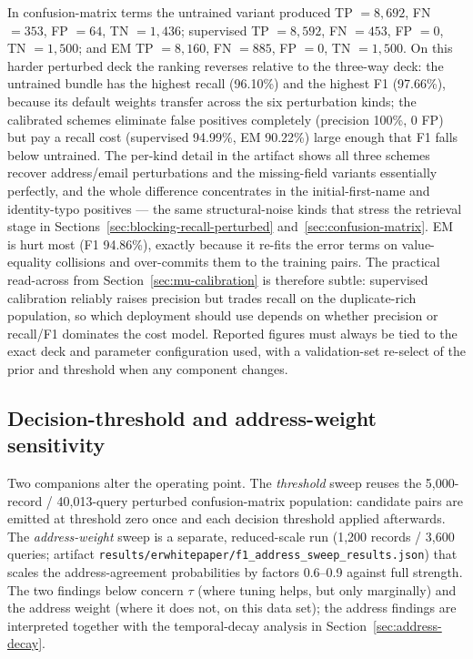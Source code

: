 \documentclass[11pt]{article}
\begin{document}
In confusion-matrix terms the untrained variant produced TP \(=8{,}692\), FN \(=353\), FP \(=64\), TN \(=1{,}436\); supervised TP \(=8{,}592\), FN \(=453\), FP \(=0\), TN \(=1{,}500\); and EM TP \(=8{,}160\), FN \(=885\), FP \(=0\), TN \(=1{,}500\). On this harder perturbed deck the ranking reverses relative to the three-way deck: the untrained bundle has the highest recall (96.10\%) and the highest F1 (97.66\%), because its default weights transfer across the six perturbation kinds; the calibrated schemes eliminate false positives completely (precision 100\%, 0 FP) but pay a recall cost (supervised 94.99\%, EM 90.22\%) large enough that F1 falls below untrained. The per-kind detail in the artifact shows all three schemes recover address/email perturbations and the missing-field variants essentially perfectly, and the whole difference concentrates in the initial-first-name and identity-typo positives --- the same structural-noise kinds that stress the retrieval stage in Sections~\ref{sec:blocking-recall-perturbed} and~\ref{sec:confusion-matrix}. EM is hurt most (F1 94.86\%), exactly because it re-fits the error terms on value-equality collisions and over-commits them to the training pairs. The practical read-across from Section~\ref{sec:mu-calibration} is therefore subtle: supervised calibration reliably raises precision but trades recall on the duplicate-rich population, so which deployment should use depends on whether precision or recall/F1 dominates the cost model. Reported figures must always be tied to the exact deck and parameter configuration used, with a validation-set re-select of the prior and threshold when any component changes.

\subsection{Decision-threshold and address-weight sensitivity}
\label{sec:address-weight}
Two companions alter the operating point. The \emph{threshold} sweep reuses the 5,000-record / 40,013-query perturbed confusion-matrix population: candidate pairs are emitted at threshold zero once and each decision threshold applied afterwards. The \emph{address-weight} sweep is a separate, reduced-scale run (1,200 records / 3,600 queries; artifact \texttt{results/erwhitepaper/f1\_address\_sweep\_results.json}) that scales the address-agreement probabilities by factors 0.6--0.9 against full strength. The two findings below concern $\tau$ (where tuning helps, but only marginally) and the address weight (where it does not, on this data set); the address findings are interpreted together with the temporal-decay analysis in Section~\ref{sec:address-decay}.
\end{document}
